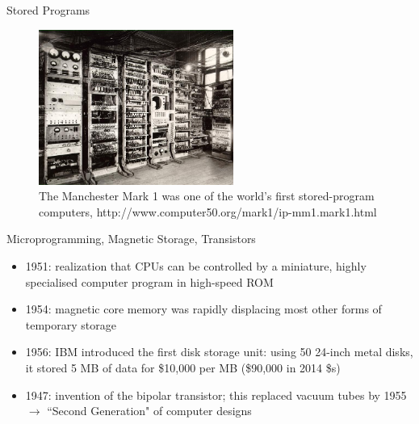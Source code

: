 \documentclass[xcolor=x11names,compress]{beamer}
\renewcommand{\(}{\begin{columns}}
\renewcommand{\)}{\end{columns}}
\newcommand{\<}[1]{\begin{column}{#1}}
\renewcommand{\>}{\end{column}}
\begin{document}
\begin{frame}{Stored Programs}

\begin{figure}
\includegraphics[height=2in,clip]{ManchesterMark1}
\caption{The Manchester Mark 1 was one of the world's first stored-program computers, http://www.computer50.org/mark1/ip-mm1.mark1.html}
\end{figure}

\end{frame}

\begin{frame}{Microprogramming, Magnetic Storage, Transistors}
\begin{itemize}
\item 1951: realization that CPUs can be controlled by a miniature, highly specialised computer program in high-speed ROM
\item 1954: magnetic core memory was rapidly displacing most other forms of temporary storage
\item 1956: IBM introduced the first disk storage unit: using 50 24-inch metal disks, it stored 5 MB of data for \$10,000 per MB (\$90,000 in 2014 \$s)
\item 1947: invention of the bipolar transistor; this replaced vacuum tubes by 1955 $\rightarrow$ ``Second Generation" of computer designs
\end{itemize}
\end{frame}
\end{document}
